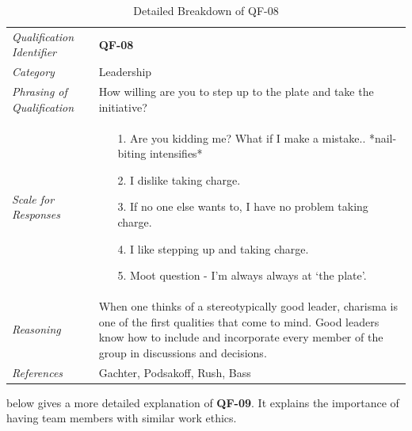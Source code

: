 \documentclass[12pt,letterpaper]{article}
\begin{document}
\begin{table}[H]
	\caption{Detailed Breakdown of QF-08}
	\begin{tabu} to 
		\toprule
		Qualification Identifier & {\bf QF-08}\\
		Category & Leadership \\
		Phrasing of Qualification & How willing are you to step up to the plate and take the initiative?\\
		Scale for Responses &
		\begin{minipage}[t]{\linewidth}
			\begin{enumerate}
				\item[1.] Are you kidding me? What if I make a mistake.. *nail-biting intensifies*
				\item[2.] I dislike taking charge.
				\item[3.] If no one else wants to, I have no problem taking charge.
				\item[4.] I like stepping up and taking charge.
				\item[5.] Moot question - I'm always always at `the plate'.
			\end{enumerate}
		\end{minipage}\\
		Reasoning & When one thinks of a stereotypically good leader, charisma is one of the first qualities that come to mind. Good leaders know how to include and incorporate every member of the group in discussions and decisions.\\
		References & Gachter\cite{gachter}, Podsakoff\cite{podsakoff}, Rush\cite{rush}, Bass\cite{bass}\\
		\toprule
	\end{tabu}
\end{table}

\newpage{}

 below gives a more detailed explanation of {\bf QF-09}. It explains the importance of having team members with similar work ethics.
\end{document}
